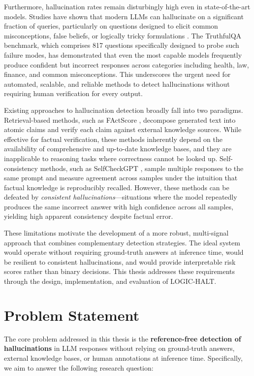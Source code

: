 Furthermore, hallucination rates remain disturbingly high even in state-of-the-art models. Studies have shown that modern LLMs can hallucinate on a significant fraction of queries, particularly on questions designed to elicit common misconceptions, false beliefs, or logically tricky formulations \cite{huang2023survey}. The TruthfulQA benchmark, which comprises 817 questions specifically designed to probe such failure modes, has demonstrated that even the most capable models frequently produce confident but incorrect responses across categories including health, law, finance, and common misconceptions. This underscores the urgent need for automated, scalable, and reliable methods to detect hallucinations without requiring human verification for every output.

Existing approaches to hallucination detection broadly fall into two paradigms. Retrieval-based methods, such as FActScore \cite{min2023factscore}, decompose generated text into atomic claims and verify each claim against external knowledge sources. While effective for factual verification, these methods inherently depend on the availability of comprehensive and up-to-date knowledge bases, and they are inapplicable to reasoning tasks where correctness cannot be looked up. Self-consistency methods, such as SelfCheckGPT \cite{manakul2023selfcheckgpt}, sample multiple responses to the same prompt and measure agreement across samples under the intuition that factual knowledge is reproducibly recalled. However, these methods can be defeated by \textit{consistent hallucinations}---situations where the model repeatedly produces the same incorrect answer with high confidence across all samples, yielding high apparent consistency despite factual error.

These limitations motivate the development of a more robust, multi-signal approach that combines complementary detection strategies. The ideal system would operate without requiring ground-truth answers at inference time, would be resilient to consistent hallucinations, and would provide interpretable risk scores rather than binary decisions. This thesis addresses these requirements through the design, implementation, and evaluation of LOGIC-HALT.

\section{Problem Statement}

The core problem addressed in this thesis is the \textbf{reference-free detection of hallucinations} in LLM responses without relying on ground-truth answers, external knowledge bases, or human annotations at inference time. Specifically, we aim to answer the following research question:

